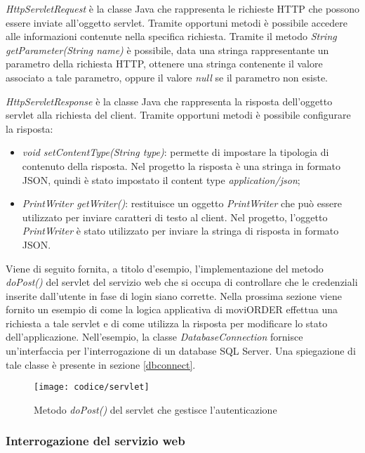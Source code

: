 \textit{HttpServletRequest} è la classe Java che rappresenta le richieste HTTP che possono essere inviate all'oggetto servlet. Tramite opportuni metodi è possibile accedere alle informazioni contenute nella specifica richiesta. Tramite il metodo \textit{String getParameter(String name)} è possibile, data una stringa rappresentante un parametro della richiesta HTTP, ottenere una stringa contenente il valore associato a tale parametro, oppure il valore \textit{null} se il parametro non esiste.

\textit{HttpServletResponse} è la classe Java che rappresenta la risposta dell'oggetto servlet alla richiesta del client. Tramite opportuni metodi è possibile configurare la risposta:
\begin{itemize}
	\item \textit{void setContentType(String type)}: permette di impostare la tipologia di contenuto della risposta. Nel progetto la risposta è una stringa in formato JSON, quindi è stato impostato il content type \textit{application/json};
	\item \textit{PrintWriter getWriter()}: restituisce un oggetto \textit{PrintWriter} che può essere utilizzato per inviare caratteri di testo al client. Nel progetto, l'oggetto \textit{PrintWriter} è stato utilizzato per inviare la stringa di risposta in formato JSON.
\end{itemize}

Viene di seguito fornita, a titolo d'esempio, l'implementazione del metodo \textit{doPost()} del servlet del servizio web che si occupa di controllare che le credenziali inserite dall'utente in fase di login siano corrette. Nella prossima sezione viene fornito un esempio di come la logica applicativa di moviORDER effettua una richiesta a tale servlet e di come utilizza la risposta per modificare lo stato dell'applicazione. Nell'esempio, la classe \textit{DatabaseConnection} fornisce un'interfaccia per l'interrogazione di un database SQL Server. Una spiegazione di tale classe è presente in sezione \ref{dbconnect}.

\begin{figure}[!h] 
    \centering 
    \texttt{[image: codice/servlet]} 
    \caption{Metodo \textit{doPost()} del servlet che gestisce l'autenticazione}
\end{figure}

\subsubsection{Interrogazione del servizio web}

